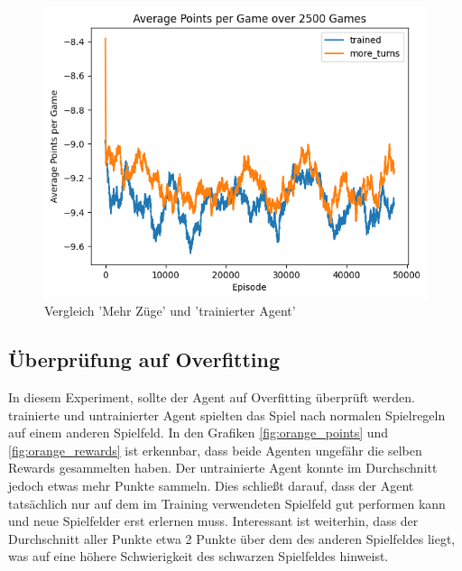 \begin{figure}[!h]
    \centering
    \includegraphics[scale=0.6]{Bilder/points_more_turns.png}
    \caption{Vergleich 'Mehr Züge' und 'trainierter Agent'}
    \label{fig:turns_points}

\end{figure}


\subsection{Überprüfung auf Overfitting}
In diesem Experiment, sollte der Agent auf Overfitting überprüft werden. trainierte und untrainierter Agent spielten das Spiel nach normalen Spielregeln auf einem anderen Spielfeld.
In den Grafiken \ref{fig:orange_points} und \ref{fig:orange_rewards} ist erkennbar, dass beide Agenten ungefähr die selben Rewards gesammelten haben. Der untrainierte Agent konnte im Durchschnitt jedoch etwas mehr Punkte sammeln.
Dies schließt darauf, dass der Agent tatsächlich nur auf dem im Training verwendeten Spielfeld gut performen kann und neue Spielfelder erst erlernen muss.
Interessant ist weiterhin, dass der Durchschnitt aller Punkte etwa 2 Punkte über dem des anderen Spielfeldes liegt, was auf eine höhere Schwierigkeit des schwarzen Spielfeldes hinweist.


